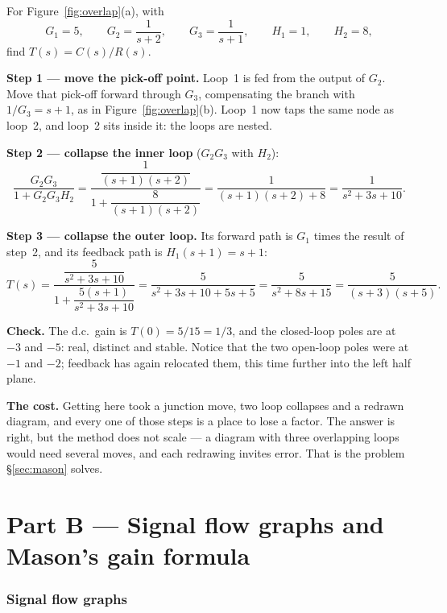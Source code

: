 \documentclass[11pt,a4paper]{article}
\begin{document}
\begin{workedex}[breakable, title=Worked example 4.3 --- overlapping loops by block-diagram algebra]
For Figure~\ref{fig:overlap}(a), with
\[
  G_1=5,\qquad G_2=\frac{1}{s+2},\qquad G_3=\frac{1}{s+1},
  \qquad H_1=1,\qquad H_2=8,
\]
find $T(s)=C(s)/R(s)$.

\medskip
\textbf{Step 1 --- move the pick-off point.} Loop~1 is fed from the output of
$G_2$. Move that pick-off forward through $G_3$, compensating the branch with
$1/G_3=s+1$, as in Figure~\ref{fig:overlap}(b). Loop~1 now taps the same node
as loop~2, and loop~2 sits inside it: the loops are nested.

\medskip
\textbf{Step 2 --- collapse the inner loop} ($G_2G_3$ with $H_2$):
\[
  \frac{G_2G_3}{1+G_2G_3H_2}
  = \frac{\dfrac{1}{(s+1)(s+2)}}{1+\dfrac{8}{(s+1)(s+2)}}
  = \frac{1}{(s+1)(s+2)+8}
  = \frac{1}{s^{2}+3s+10} .
\]

\medskip
\textbf{Step 3 --- collapse the outer loop.} Its forward path is $G_1$ times
the result of step~2, and its feedback path is $H_1(s+1)=s+1$:
\[
  T(s)=\frac{\dfrac{5}{s^{2}+3s+10}}
            {1+\dfrac{5(s+1)}{s^{2}+3s+10}}
   =\frac{5}{s^{2}+3s+10+5s+5}
   =\frac{5}{s^{2}+8s+15}
   =\frac{5}{(s+3)(s+5)} .
\]

\medskip
\textbf{Check.} The d.c.\ gain is $T(0)=5/15=1/3$, and the closed-loop poles
are at $-3$ and $-5$: real, distinct and stable. Notice that the two open-loop
poles were at $-1$ and $-2$; feedback has again relocated them, this time
further into the left half plane.

\medskip
\textbf{The cost.} Getting here took a junction move, two loop collapses and a
redrawn diagram, and every one of those steps is a place to lose a factor. The
answer is right, but the method does not scale --- a diagram with three
overlapping loops would need several moves, and each redrawing invites error.
That is the problem \S\ref{sec:mason} solves.
\end{workedex}

\part*{Part B --- Signal flow graphs and Mason's gain formula}

\section{Signal flow graphs}
\label{sec:sfg}
\end{document}
